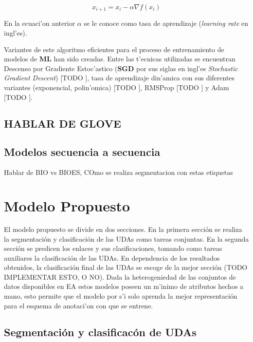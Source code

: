 \begin{equation}
	x_{i+1} = x_i - \alpha \nabla f(x_i)
\end{equation}\label{eq:gradien_descent}

En la ecuaci'on anterior $\alpha$ se le conoce como tasa de aprendizaje (\emph{learning rate} en ingl'es).

Variantes de este algoritmo eficientes para el proceso de entrenamiento de modelos de \textbf{ML} han sido 
creadas. Entre las t'ecnicas utilizadas se encuentran Descenso por Gradiente Estoc'astico (\textbf{SGD} por sus siglas 
en ingl'es \emph{Stochastic Gradient Descent}) [TODO \cite{}], tasa de aprendizaje din'amica con sus diferentes
variantes (exponencial, polin'omica) [TODO \cite{}], RMSProp [TODO \cite{}] y Adam [TODO \cite{}]. 

\subsection{HABLAR DE GLOVE}

\subsection{Modelos secuencia a secuencia}

Hablar de BIO vs BIOES, COmo se realiza segmentacion con estas etiquetas

\section{Modelo Propuesto}

El modelo propuesto se divide en dos secciones. En la primera sección se realiza la segmentación y clasificación de 
las UDAs como tareas conjuntas. En la segunda sección se predicen los enlaces y sus clasificaciones, tomando
como tareas auxiliares la clasificación de las UDAs. En dependencia de los resultados obtenidos, la clasificación final de 
las UDAs se escoge de la mejor sección (TODO IMPLEMENTAR ESTO, O NO). 
Dada la heterogeniedad de las conjuntos de datos disponibles en EA estos modelos poseen un m'inimo de 
atributos hechos a mano, esto permite que el modelo por s'i solo aprenda la mejor representación para el
esquema de anotaci'on con que se entrene. 

\subsection{Segmentación y clasificacón de UDAs}

